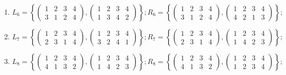 \documentclass[14pt,a4paper]{scrartcl}
\begin{document}
\begin{spacing}{1}
\begin{enumerate}
		\item $L_6 = \left\{ 
		\begin{pmatrix}
		1 & 2 & 3 & 4 \\
		3 & 1 & 2 & 4
		\end{pmatrix},
		\begin{pmatrix}
		1 & 2 & 3 & 4 \\
		1 & 3 & 4 & 2
		\end{pmatrix}
		\right\};
		R_6 = \left\{ 
		\begin{pmatrix}
		1 & 2 & 3 & 4 \\
		3 & 1 & 2 & 4
		\end{pmatrix},
		\begin{pmatrix}
		1 & 2 & 3 & 4 \\
		4 & 2 & 1 & 3
		\end{pmatrix}
		\right\};$
		
		\item $L_7 = \left\{ 
		\begin{pmatrix}
		1 & 2 & 3 & 4 \\
		2 & 3 & 1 & 4
		\end{pmatrix},
		\begin{pmatrix}
		1 & 2 & 3 & 4 \\
		3 & 2 & 4 & 1
		\end{pmatrix}
		\right\};
		R_7 = \left\{ 
		\begin{pmatrix}
		1 & 2 & 3 & 4 \\
		2 & 3 & 1 & 4
		\end{pmatrix},
		\begin{pmatrix}
		1 & 2 & 3 & 4 \\
		1 & 4 & 2 & 3
		\end{pmatrix}
		\right\};$
		
		\item $L_8 = \left\{ 
		\begin{pmatrix}
		1 & 2 & 3 & 4 \\
		4 & 1 & 3 & 2
		\end{pmatrix},
		\begin{pmatrix}
		1 & 2 & 3 & 4 \\
		1 & 4 & 2 & 3
		\end{pmatrix}
		\right\};
		R_8 = \left\{ 
		\begin{pmatrix}
		1 & 2 & 3 & 4 \\
		4 & 1 & 3 & 2
		\end{pmatrix},
		\begin{pmatrix}
		1 & 2 & 3 & 4 \\
		1 & 2 & 3 & 4
		\end{pmatrix}
		\right\};$
		

\end{enumerate}
\end{spacing}
\end{document}
